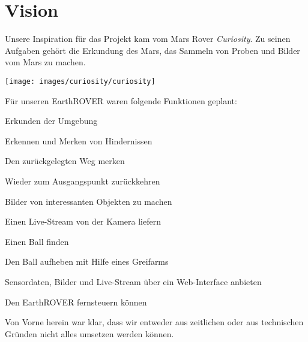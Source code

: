 \chapter{Vision}
Unsere Inspiration für das Projekt kam vom Mars Rover \textit{Curiosity}. Zu seinen Aufgaben gehört die Erkundung des Mars, das Sammeln von Proben und Bilder vom Mars zu machen. 

\begin{capfigure}[Curiosity]
	\texttt{[image: images/curiosity/curiosity]}
\end{capfigure}

Für unseren EarthROVER waren folgende Funktionen geplant:
\begin{capitemize}
	\item Erkunden der Umgebung
	\item Erkennen und Merken von Hindernissen
	\item Den zurückgelegten Weg merken
	\item Wieder zum Ausgangspunkt zurückkehren
	\item Bilder von interessanten Objekten zu machen
	\item Einen Live-Stream von der Kamera liefern
	\item Einen Ball finden
	\item Den Ball aufheben mit Hilfe eines Greifarms
	\item Sensordaten, Bilder und Live-Stream über ein Web-Interface anbieten
	\item Den EarthROVER fernsteuern können
\end{capitemize}


Von Vorne herein war klar, dass wir entweder aus zeitlichen oder aus technischen Gründen nicht alles umsetzen werden können.
